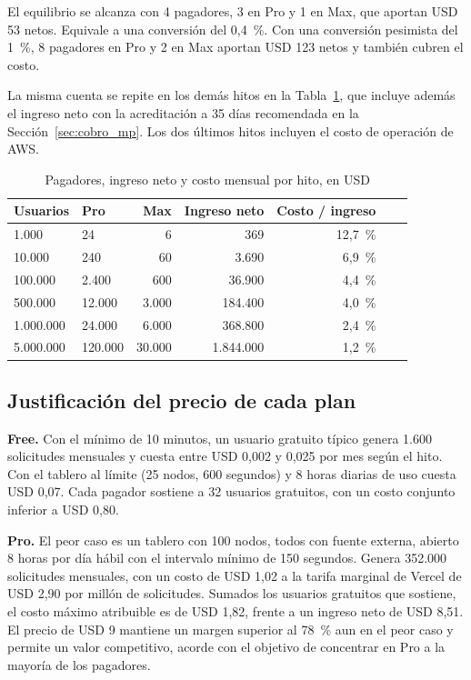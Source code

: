 El equilibrio se alcanza con 4 pagadores, 3 en Pro y 1 en Max, que aportan USD 53 netos. Equivale a una conversión del 0,4~\%. Con una conversión pesimista del 1~\%, 8 pagadores en Pro y 2 en Max aportan USD 123 netos y también cubren el costo.

La misma cuenta se repite en los demás hitos en la Tabla~\ref{tab:cobertura_hitos}, que incluye además el ingreso neto con la acreditación a 35 días recomendada en la Sección~\ref{sec:cobro_mp}. Los dos últimos hitos incluyen el costo de operación de AWS.

\begin{table}[H]
  \centering
  \renewcommand{\arraystretch}{1.2}
  \small
  \begin{tabular}{l l r r r r r}
    \toprule
    Usuarios & Pro & Max & Ingreso neto & Costo / ingreso \\
    \midrule
    1.000 & 24 & 6 & 369 & 12,7~\% \\
    10.000 & 240 & 60 & 3.690 & 6,9~\% \\
    100.000 & 2.400 & 600 & 36.900 & 4,4~\% \\
    500.000 & 12.000 & 3.000 & 184.400 & 4,0~\% \\
    1.000.000 & 24.000 & 6.000 & 368.800 & 2,4~\% \\
    5.000.000 & 120.000 & 30.000 & 1.844.000 & 1,2~\% \\
    \bottomrule
  \end{tabular}
  \caption{Pagadores, ingreso neto y costo mensual por hito, en USD}
  \label{tab:cobertura_hitos}
\end{table}

\subsection{Justificación del precio de cada plan}
\textbf{Free.} Con el mínimo de 10 minutos, un usuario gratuito típico genera 1.600 solicitudes mensuales y cuesta entre USD 0,002 y 0,025 por mes según el hito. Con el tablero al límite (25 nodos, 600 segundos) y 8 horas diarias de uso cuesta USD 0,07. Cada pagador sostiene a 32 usuarios gratuitos, con un costo conjunto inferior a USD 0,80.

\textbf{Pro.} El peor caso es un tablero con 100 nodos, todos con fuente externa, abierto 8 horas por día hábil con el intervalo mínimo de 150 segundos. Genera 352.000 solicitudes mensuales, con un costo de USD 1,02 a la tarifa marginal de Vercel de USD 2,90 por millón de solicitudes. Sumados los usuarios gratuitos que sostiene, el costo máximo atribuible es de USD 1,82, frente a un ingreso neto de USD 8,51. El precio de USD 9 mantiene un margen superior al 78~\% aun en el peor caso y permite un valor competitivo, acorde con el objetivo de concentrar en Pro a la mayoría de los pagadores.

